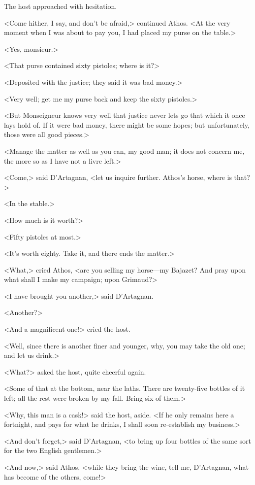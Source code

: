 The host approached with hesitation. 

<Come hither, I say, and don't be afraid,> continued Athos. <At the very moment when I was about to pay you, I had placed my purse on the table.> 

<Yes, monsieur.> 

<That purse contained sixty pistoles; where is it?> 

<Deposited with the justice; they said it was bad money.> 

<Very well; get me my purse back and keep the sixty pistoles.> 

<But Monseigneur knows very well that justice never lets go that which it once lays hold of. If it were bad money, there might be some hopes; but unfortunately, those were all good pieces.> 

<Manage the matter as well as you can, my good man; it does not concern me, the more so as I have not a livre left.> 

<Come,> said D'Artagnan, <let us inquire further. Athos's horse, where is that?> 

<In the stable.> 

<How much is it worth?> 

<Fifty pistoles at most.> 

<It's worth eighty. Take it, and there ends the matter.> 

<What,> cried Athos, <are you selling my horse—my Bajazet? And pray upon what shall I make my campaign; upon Grimaud?> 

<I have brought you another,> said D'Artagnan. 

<Another?> 

<And a magnificent one!> cried the host. 

<Well, since there is another finer and younger, why, you may take the old one; and let us drink.> 

<What?> asked the host, quite cheerful again. 

<Some of that at the bottom, near the laths. There are twenty-five bottles of it left; all the rest were broken by my fall. Bring six of them.> 

<Why, this man is a cask!> said the host, aside. <If he only remains here a fortnight, and pays for what he drinks, I shall soon re-establish my business.> 

<And don't forget,> said D'Artagnan, <to bring up four bottles of the same sort for the two English gentlemen.> 

<And now,> said Athos, <while they bring the wine, tell me, D'Artagnan, what has become of the others, come!> 

